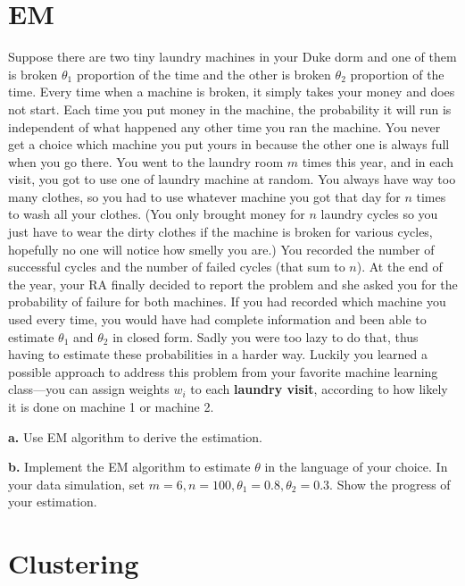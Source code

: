 \documentclass{article}
\begin{document}
\section{EM}
Suppose there are two tiny laundry machines in your Duke dorm and one of them is broken $\theta_1$ proportion of the time and the other is broken $\theta_2$ proportion of the time. Every time when a machine is broken, it simply takes your money and does not start. Each time you put money in the machine, the probability it will run is independent of what happened any other time you ran the machine. You never get a choice which machine you put yours in because the other one is always full when you go there. You went to the laundry room $m$ times this year, and in each visit, you got to use one of laundry machine at random. You always have way too many clothes, so you had to use whatever machine you got that day for $n$ times to wash all your clothes. (You only brought money for $n$ laundry cycles so you just have to wear the dirty clothes if the machine is broken for various cycles, hopefully no one will notice how smelly you are.) You recorded the number of successful cycles and the number of failed cycles (that sum to $n$). At the end of the year, your RA finally decided to report the problem and she asked you for the probability of failure for both machines. If you had recorded which machine you used every time, you would have had complete information and been able to estimate $\theta_1$ and $\theta_2$ in closed form. Sadly you were too lazy to do that, thus having to estimate these probabilities in a harder way. Luckily you learned a possible approach to address this problem from your favorite machine learning class---you can assign weights $w_i$ to each \textbf{laundry visit}, according to how likely it is done on machine 1 or machine 2.

\textbf{a.} Use EM algorithm to derive the estimation.

\textbf{b.} Implement the EM algorithm to estimate $\theta$ in the language of your choice. In your data simulation, set $m = 6, n = 100, \theta_1 = 0.8, \theta_2 = 0.3$. Show the progress of your estimation. 


\section{Clustering}
\end{document}

